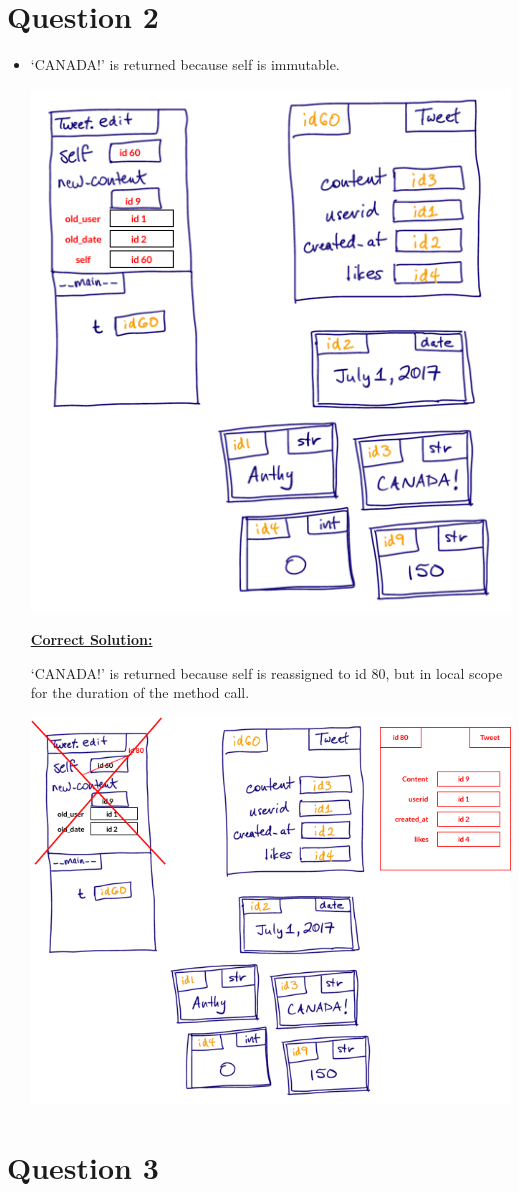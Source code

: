 \documentclass[12pt]{article}
\begin{document}
\section*{Question 2}
\begin{itemize}
    \item `CANADA!' is returned because self is immutable.

    \begin{center}
    \includegraphics[width=0.7\linewidth]{images/worksheet_3_q2_solution.png}
    \end{center}

    \newpage

    \begin{mdframed}
        \underline{\textbf{Correct Solution:}}

        \bigskip

        `CANADA!' is returned because self is \color{red}reassigned to id 80, but in local scope
        for the duration of the method call\color{black}.

        \begin{center}
        \includegraphics[width=0.7\linewidth]{images/worksheet_3_q2_correction.png}
        \end{center}
    \end{mdframed}
\end{itemize}

\section*{Question 3}
\end{document}
